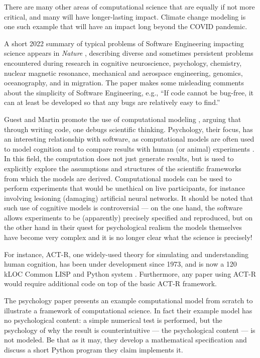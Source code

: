 \documentclass{comjnl}
\begin{document}
There are many other areas of computational science that are equally if not more critical, and many will have longer-lasting impact. Climate change modeling is one such example that will have an impact long beyond the COVID pandemic.

A short 2022 summary of typical problems of Software Engineering impacting science appears in \emph{Nature\/} \cite{nature-review}, describing diverse and sometimes persistent problems encountered during research in cognitive neuroscience, psychology, chemistry, nuclear magnetic resonance, mechanical and aerospace engineering, genomics, oceanography, and in migration. The paper \cite{nature-review}  makes some misleading comments about the simplicity of Software Engineering, e.g., ``If code cannot be bug-free, it can at least be developed so that any bugs are relatively easy to find.''

Guest and Martin promote the use of computational modeling \cite{psychological-modeling}, arguing that through writing code, one debugs scientific thinking. Psychology, their focus, has an interesting relationship with software, as computational models are often used to model cognition and to compare results with human (or animal) experiments \cite{psychological-modeling}. In this field, the computation does not just generate results, but is used to explicitly explore the assumptions and structures of the scientific frameworks from which the models are derived. Computational models can be used to perform experiments that would be unethical on live participants, for instance involving lesioning (damaging) artificial neural networks. It should be noted that such use of cognitive models is controversial --- on the one hand, the software allows experiments to be (apparently) precisely specified and reproduced, but on the other hand in their quest for psychological realism the models themselves have become very complex and it is no longer clear what the science is precisely!

For instance, ACT-R, one widely-used theory for simulating and understanding human cognition, has been under development since 1973, and is now a 120 kLOC Common LISP and Python system \cite{actr}. Furthermore, any paper using ACT-R would require additional code on top of the basic ACT-R framework.

The psychology paper \cite{psychological-modeling} presents an example computational model from scratch to illustrate a framework of computational science. In fact their example model has no psychological content: a simple numerical test is performed, but the psychology of why the result is counterintuitive --- the psychological content --- is not modeled. Be that as it may, they develop a mathematical specification and discuss a short Python program they claim implements it. 
\end{document}
